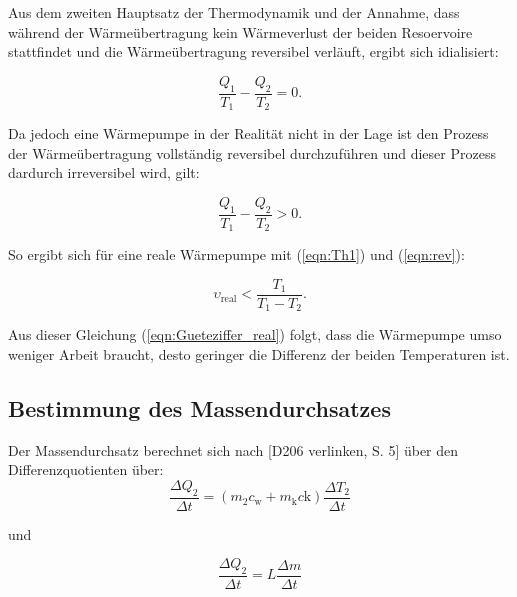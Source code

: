         Aus dem zweiten Hauptsatz der Thermodynamik und der Annahme, dass während der Wärmeübertragung kein Wärmeverlust der beiden Resoervoire stattfindet
         und die Wärmeübertragung reversibel verläuft, ergibt sich idialisiert:

        \begin{equation}
            \frac{Q_1}{T_1} - \frac{Q_2}{T_2} = 0.
            \label{eqn:irev}
        \end{equation}
        
        Da jedoch eine Wärmepumpe in der Realität nicht in der Lage ist den Prozess der Wärmeübertragung vollständig reversibel durchzuführen und dieser Prozess dardurch irreversibel wird, gilt:

        \begin{equation}
            \frac{Q_1}{T_1} - \frac{Q_2}{T_2} > 0.
            \label{eqn:rev}
        \end{equation}

        So ergibt sich für eine reale Wärmepumpe mit (\ref{eqn:Th1}) und (\ref{eqn:rev}):

        \begin{equation}
            \upsilon_\text{real} < \frac{T_1}{T_1 - T_2}.
            \label{eqn:Gueteziffer_real}
        \end{equation}

        Aus dieser Gleichung (\ref{eqn:Gueteziffer_real}) folgt, dass die Wärmepumpe umso weniger Arbeit braucht, desto geringer die Differenz der beiden Temperaturen ist.



        \subsection{Bestimmung des Massendurchsatzes}

        Der Massendurchsatz berechnet sich nach [D206 verlinken, S. 5] über den Differenzquotienten über:
        \begin{equation}
            \frac{\Delta Q_2}{\Delta t} = \left( m_2  c_\text{w} + m_\text{k} c\text{k}\right) \frac{\Delta T_2}{\Delta t}
            \label{eqn:mass1}
        \end{equation}

        und 

        \begin{equation}
            \frac{\Delta Q_2}{\Delta t} = L \frac{\Delta m}{\Delta t}
            \label{eqn:mass2}
        \end{equation}

